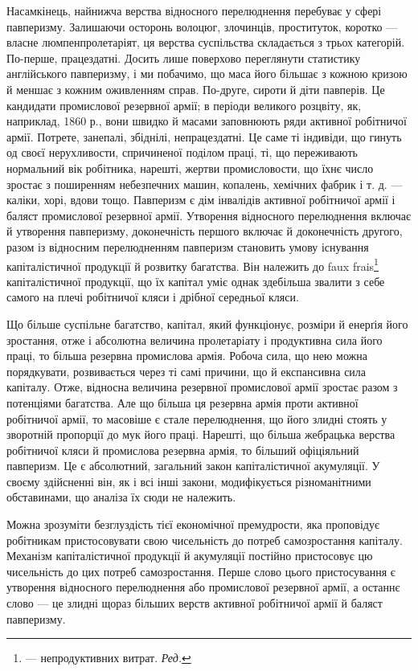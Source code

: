 Насамкінець, найнижча верства відносного перелюднення
перебуває у сфері павперизму. Залишаючи осторонь волоцюг,
злочинців, проституток, коротко — власне люмпенпролетаріят,
ця верства суспільства складається з трьох категорій. По-перше,
працездатні. Досить лише поверхово переглянути статистику
англійського павперизму, і ми побачимо, що маса його більшає
з кожною кризою й меншає з кожним оживленням справ. По-друге,
сироти й діти павперів. Це кандидати промислової резервної
армії; в періоди великого розцвіту, як, наприклад, 1860 р., вони
швидко й масами заповнюють ряди активної робітничої армії.
Потрете, занепалі, збіднілі, непрацездатні. Це саме ті індивіди,
що гинуть од своєї нерухливости, спричиненої поділом праці,
ті, що переживають нормальний вік робітника, нарешті, жертви
промисловости, що їхнє число зростає з поширенням небезпечних
машин, копалень, хемічних фабрик і т. д. — каліки, хорі,
вдови тощо. Павперизм є дім інвалідів активної робітничої армії
і баляст промислової резервної армії. Утворення відносного
перелюднення включає й утворення павперизму, доконечність
першого включає й доконечність другого, разом із відносним
перелюдненням павперизм становить умову існування капіталістичної
продукції й розвитку багатства. Він належить до faux
frais\footnote*{
— непродуктивних витрат. \emph{Ред.}
} капіталістичної продукції, що їх капітал уміє однак здебільша
звалити з себе самого на плечі робітничої кляси і дрібної
середньої кляси.

Що більше суспільне багатство, капітал, який функціонує,
розміри й енерґія його зростання, отже і абсолютна величина пролетаріату
і продуктивна сила його праці, то більша резервна промислова
армія. Робоча сила, що нею можна порядкувати, розвивається
через ті самі причини, що й експансивна сила капіталу.
Отже, відносна величина резервної промислової армії зростає
разом з потенціями багатства. Але що більша ця резервна армія
проти активної робітничої армії, то масовіше є стале перелюднення,
що його злидні стоять у зворотній пропорції до мук його
праці. Нарешті, що більша жебрацька верства робітничої кляси
й промислова резервна армія, то більший офіціяльний павперизм.
Це є абсолютний, загальний закон капіталістичної акумуляції.
У своєму здійсненні він, як і всі інші закони, модифікується
різноманітними обставинами, що аналіза їх сюди не
належить.

Можна зрозуміти безглуздість тієї економічної премудрости,
яка проповідує робітникам пристосовувати свою чисельність до
потреб самозростання капіталу. Механізм капіталістичної продукції
й акумуляції постійно пристосовує цю чисельність до цих
потреб самозростання. Перше слово цього пристосування є утворення
відносного перелюднення або промислової резервної армії,
а останнє слово — це злидні щораз більших верств активної
робітничої армії й баляст павперизму.